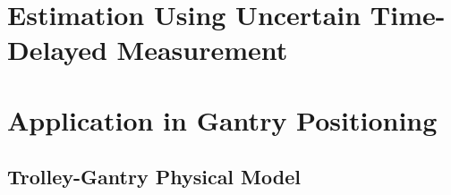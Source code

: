 \section{Estimation Using Uncertain Time-Delayed Measurement} \label{sect:estimation_delayed_msr}	
	
	
%		

\section{Application in Gantry Positioning}
	
	\subsection{Trolley-Gantry Physical Model}
	
	



\clearpage

%

\clearpage




